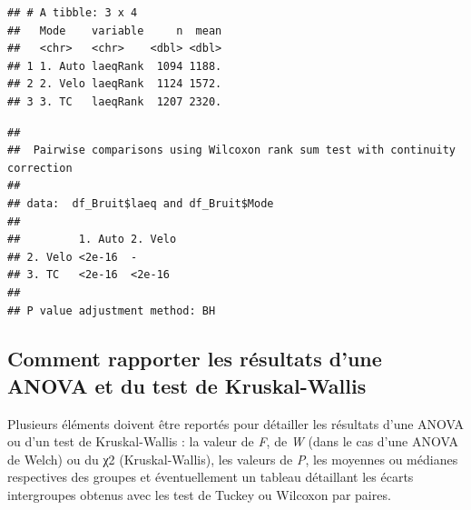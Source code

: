 \documentclass[
  11pt,
  french,
]{book}
\makeatletter
\newenvironment{Shaded}{\begin{snugshade}}{\end{snugshade}}
\newcommand{\CommentTok}[1]{\textcolor[rgb]{0.56,0.35,0.01}{\textit{#1}}}
\newcommand{\DataTypeTok}[1]{\textcolor[rgb]{0.13,0.29,0.53}{#1}}
\newcommand{\KeywordTok}[1]{\textcolor[rgb]{0.13,0.29,0.53}{\textbf{#1}}}
\newcommand{\NormalTok}[1]{#1}
\newcommand{\OperatorTok}[1]{\textcolor[rgb]{0.81,0.36,0.00}{\textbf{#1}}}
\newcommand{\StringTok}[1]{\textcolor[rgb]{0.31,0.60,0.02}{#1}}
\newenvironment{kframe}{%
\medskip{}
\setlength{\fboxsep}{.8em}
 \def\at@end@of@kframe{}%
 \ifinner\ifhmode%
  \def\at@end@of@kframe{\end{minipage}}%
  \begin{minipage}{\columnwidth}%
 \fi\fi%
 \def\FrameCommand##1{\hskip\@totalleftmargin \hskip-\fboxsep
 \colorbox{shadecolor}{##1}\hskip-\fboxsep
     \hskip-\linewidth \hskip-\@totalleftmargin \hskip\columnwidth}%
 \MakeFramed {\advance\hsize-\width
   \@totalleftmargin\z@ \linewidth\hsize
   \@setminipage}}%
 {\par\unskip\endMakeFramed%
 \at@end@of@kframe}
\renewenvironment{Shaded}{\begin{kframe}}{\end{kframe}}
\makeatother
\begin{document}
\begin{verbatim}
## # A tibble: 3 x 4
##   Mode    variable     n  mean
##   <chr>   <chr>    <dbl> <dbl>
## 1 1. Auto laeqRank  1094 1188.
## 2 2. Velo laeqRank  1124 1572.
## 3 3. TC   laeqRank  1207 2320.
\end{verbatim}

\begin{Shaded}
\end{Shaded}

\begin{verbatim}
## 
## 	Pairwise comparisons using Wilcoxon rank sum test with continuity correction 
## 
## data:  df_Bruit$laeq and df_Bruit$Mode 
## 
##         1. Auto 2. Velo
## 2. Velo <2e-16  -      
## 3. TC   <2e-16  <2e-16 
## 
## P value adjustment method: BH
\end{verbatim}

\hypertarget{sect0444}{%
\subsection{Comment rapporter les résultats d'une ANOVA et du test de Kruskal-Wallis}\label{sect0444}}

Plusieurs éléments doivent être reportés pour détailler les résultats d'une ANOVA ou d'un test de Kruskal-Wallis : la valeur de \emph{F}, de \emph{W} (dans le cas d'une ANOVA de Welch) ou du χ2 (Kruskal-Wallis), les valeurs de \emph{P}, les moyennes ou médianes respectives des groupes et éventuellement un tableau détaillant les écarts intergroupes obtenus avec les test de Tuckey ou Wilcoxon par paires.
\end{document}
